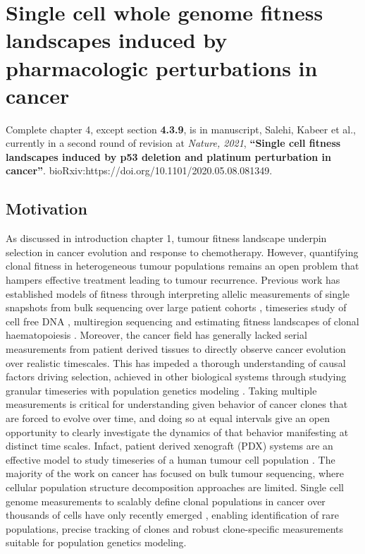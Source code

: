 
{\chapter{Single  cell  whole genome fitness  landscapes  induced  by pharmacologic perturbations in cancer}
}
\label{ch:Chapter4}
Complete chapter 4, except section \textbf{4.3.9}, is in manuscript, Salehi, Kabeer et al., currently in a second round of revision at \textit{Nature, 2021}, \textbf{``Single cell fitness landscapes induced by p53 deletion and platinum perturbation in cancer''}. bioRxiv:https://doi.org/10.1101/2020.05.08.081349.

\section{Motivation}
As discussed in introduction chapter 1, tumour fitness landscape underpin selection in cancer evolution and response to chemotherapy. However, quantifying clonal fitness in heterogeneous tumour populations remains an open problem that hampers effective treatment leading to tumour recurrence. Previous work has established models of fitness through interpreting allelic measurements of single snapshots \cite{williams2016identification, williams2018quantification,gerstung2020evolutionary,shah2012clonal,nik2012life} from bulk sequencing over large patient cohorts \cite{martincorena2017universal}, timeseries study of cell free DNA \cite{khan2018longitudinal}, multiregion sequencing \cite{Gerlinger2014-qd,Jamal-Hanjani2017-yc,Lopez2020-ku,mcpherson2016divergent,williams2018quantification} and estimating fitness landscapes of clonal haematopoiesis \cite{Watson2020-yu}. Moreover, the cancer field has generally lacked serial measurements from patient derived tissues to directly observe cancer evolution over realistic timescales. This has impeded a thorough understanding of causal factors driving selection, achieved in other biological systems through studying granular timeseries with population genetics modeling \cite{good2017dynamics}. Taking multiple measurements is critical for understanding  given behavior of cancer clones that are forced to evolve over time, and doing so at equal intervals give an open opportunity to clearly investigate the dynamics of that behavior manifesting at distinct time scales. Infact, patient derived xenograft (PDX)\cite{aparicio2015examining} systems are an effective model to study timeseries of a human tumour cell population \cite{williams2018using,willey2015patient}.
The majority of the work on cancer has focused on bulk tumour sequencing, where cellular population structure decomposition approaches are limited. Single cell genome measurements to scalably define clonal populations in cancer over thousands of cells have only recently emerged \cite{Laks2019-dm,zahn2017scalable}, enabling identification of rare populations, precise tracking of clones and robust clone-specific measurements suitable for population genetics modeling. 
